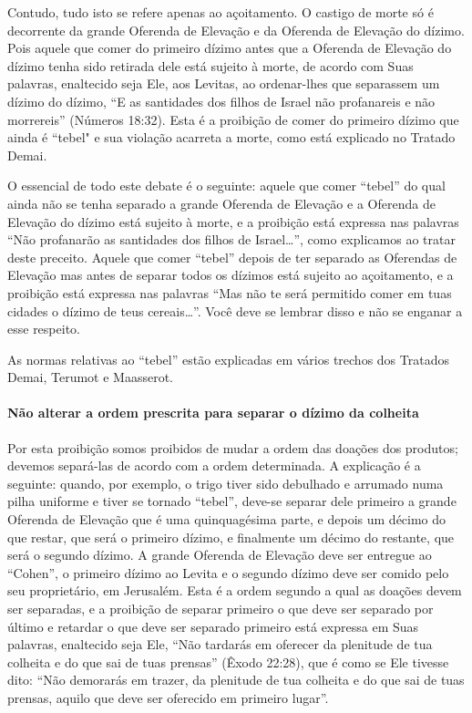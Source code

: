 Contudo, tudo isto se refere apenas ao açoitamento. O castigo de morte
só é decorrente da grande Oferenda de Elevação e da Oferenda de
Elevação do dízimo. Pois aquele que comer do primeiro dízimo antes que
a Oferenda de Elevação do dízimo tenha sido retirada dele está sujeito
à morte, de acordo com Suas palavras, enaltecido seja Ele, aos Levitas,
ao ordenar-lhes que separassem um dízimo do dízimo, ``E as santidades
dos filhos de Israel não profanareis e não morrereis'' (Números 18:32).
Esta é a proibição de comer do primeiro dízimo que ainda é ``tebel" e
sua violação acarreta a morte, como está explicado no Tratado Demai.

O essencial de todo este debate é o seguinte: aquele que comer
``tebel'' do qual ainda não se tenha separado a grande Oferenda de
Elevação e a Oferenda de Elevação do dízimo está sujeito à morte, e a
proibição está expressa nas palavras ``Não profanarão as santidades dos
filhos de Israel\ldots{}'', como explicamos ao tratar deste preceito. Aquele
que comer ``tebel'' depois de ter separado as Oferendas de Elevação mas
antes de separar todos os dízimos está sujeito ao açoitamento, e a
proibição está expressa nas palavras ``Mas não te será permitido comer
em tuas cidades o dízimo de teus cereais\ldots{}''. Você deve se lembrar
disso e não se enganar a esse respeito.

As normas relativas ao ``tebel'' estão explicadas em vários trechos dos
Tratados Demai, Terumot e Maasserot.

\paragraph{Não alterar a ordem prescrita para separar o dízimo da colheita}

Por esta proibição somos proibidos de mudar a ordem das doações dos
produtos; devemos separá-las de acordo com a ordem determinada. A
explicação é a seguinte: quando, por exemplo, o trigo tiver sido
debulhado e arrumado numa pilha uniforme e tiver se tornado ``tebel'',
deve-se separar dele primeiro a grande Oferenda de Elevação que é uma
quinquagésima parte, e depois um décimo do que restar, que será o
primeiro dízimo, e finalmente um décimo do restante, que será o segundo
dízimo. A grande Oferenda de Elevação deve ser entregue ao ``Cohen'', o
primeiro dízimo ao Levita e o segundo dízimo deve ser comido pelo seu
proprietário, em Jerusalém. Esta é a ordem segundo a qual as doações
devem ser separadas, e a proibição de separar primeiro o que deve ser
separado por último e retardar o que deve ser separado primeiro está
expressa em Suas palavras, enaltecido seja Ele, ``Não tardarás em
oferecer da plenitude de tua colheita e do que sai de tuas prensas''
(Êxodo 22:28), que é como se Ele tivesse dito: ``Não demorarás em
trazer, da plenitude de tua colheita e do que sai de tuas prensas, aquilo que deve ser oferecido em primeiro lugar''.

